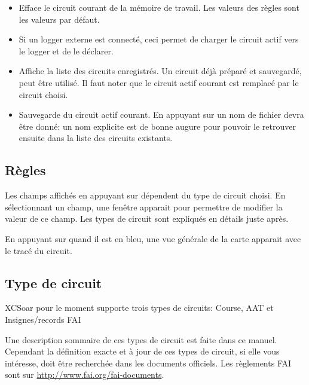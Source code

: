 \begin{itemize}
\item {} Efface le circuit courant de la mémoire de travail. Les valeurs des règles sont les valeurs par défaut.
\item {}  Si un logger externe est connecté, ceci permet de charger le circuit actif vers le logger et de le déclarer.
\item {} Affiche la liste des circuits enregistrés. Un circuit déjà préparé et sauvegardé, peut être utilisé. Il faut noter que le circuit actif courant est remplacé par le circuit choisi.
\item {}  Sauvegarde du circuit actif courant. En appuyant sur  un nom de fichier devra être donné: un nom explicite est de bonne augure pour pouvoir le retrouver ensuite dans la liste des circuits existants.
\end{itemize}

\subsection*{Règles}
Les champs affichés en appuyant sur   dépendent du type de circuit choisi. En sélectionnant un champ, une fenêtre apparait pour permettre de modifier la valeur de ce champ. Les types de circuit sont expliqués en détails juste après.

En appuyant sur  quand il est en bleu, une vue générale de la carte apparait avec le tracé du circuit.

\subsection*{Type de circuit}
XCSoar pour le moment supporte trois types de circuits: Course, AAT et Insignes/records FAI

Une description sommaire de ces types de circuit est faite dans ce manuel. Cependant la définition exacte et à jour de ces types de circuit, si elle vous intéresse, doit être recherchée  dans les documents officiels. Les règlements FAI sont sur  \url{http://www.fai.org/fai-documents}. 

